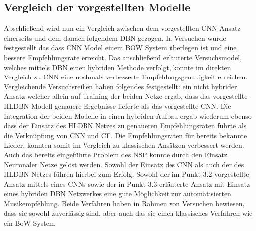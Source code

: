 \documentclass[twosided,a4,10pt]{article}
\begin{document}
\begin{multicols}{2}
		\section{Vergleich der vorgestellten Modelle}
		Abschließend wird nun ein Vergleich zwischen dem vorgestellten CNN Ansatz einerseits und dem danach folgendem DBN gezogen. In Versuchen \cite{oord} wurde festgestellt das dass CNN Model einem BOW System überlegen ist und eine bessere Empfehlungsrate erreicht. Das anschließend erläuterte  Versuchsmodel, welches mittels DBN einen hybriden Methode verfolgt, konnte im direkten Vergleich zu CNN eine nochmals verbesserte Empfehlungsgenauigkeit erreichen. Vergleichende Versuchsreihen \cite{wang} haben folgendes festgestellt: ein nicht hybrider Ansatz welcher allein auf Training der beiden Netze ergab, dass das vorgestellte HLDBN Modell genauere Ergebnisse lieferte als das vorgestellte CNN. Die Integration der beiden Modelle in einen hybriden Aufbau ergab wiederum ebenso dass der Einsatz des HLDBN Netzes zu genaueren Empfehlungsraten führte als die Verknüpfung von CNN und CF. Die Empfehlungsraten für bereits bekannte Lieder, konnten somit im Vergleich zu klassischen Ansätzen verbessert werden. Auch das bereits eingeführte Problem des NSP konnte durch den Einsatz Neuronaler Netze gelöst werden.  Sowohl der Einsatz des CNN als auch der des HLDBN Netzes führen hierbei zum Erfolg.
		Sowohl der im Punkt 3.2 vorgestellte Ansatz mittels eines CNNs sowie der in Punkt 3.3 erläuterte Ansatz mit Einsatz eines hybriden DBN Netzwerkes eine gute Möglichkeit zur automatisierten Musikempfehlung. Beide Verfahren haben in Rahmen von Versuchen bewiesen, dass sie sowohl zuverlässig sind, aber auch das sie einen klassisches Verfahren wie ein BoW-System 
		
		
	\end{multicols}
\end{document}
